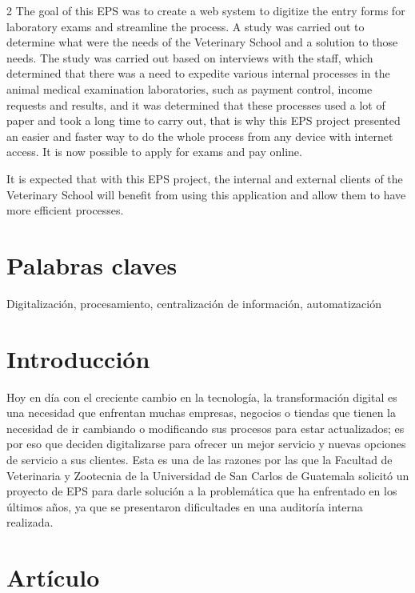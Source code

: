 \documentclass[12pt,spanish,Letterpaper,openany]{book}
\begin{document}
\begin {multicols}{2}
The goal of this EPS was to create a web system to digitize the entry forms for laboratory exams and streamline the process. A study was carried out to determine what were the needs of the Veterinary School and a solution to those needs.
The study was carried out based on interviews with the staff, which determined that there was a need to expedite various internal processes in the animal medical examination laboratories, such as payment control, income requests and results, and it was determined that these processes used a lot of paper and took a long time to carry out, that is why this EPS project presented an easier and faster way to do the whole process from any device with internet access. It is now possible to apply for exams and pay online.

It is expected that with this EPS project, the internal and external clients of the Veterinary School will benefit from using this application and allow them to have more efficient processes.

\hypertarget{palabras-claves-1}{%
\section{Palabras claves}\label{palabras-claves-1}}

Digitalización, procesamiento, centralización de información, automatización

\hypertarget{introducciuxf3n-1}{%
\section{Introducción}\label{introducciuxf3n-1}}

Hoy en día con el creciente cambio en la tecnología, la transformación digital es una necesidad que enfrentan muchas empresas, negocios o tiendas que tienen la necesidad de ir cambiando o modificando sus procesos para estar actualizados; es por eso que deciden digitalizarse para ofrecer un mejor servicio y nuevas opciones de servicio a sus clientes. Esta es una de las razones por las que la Facultad de Veterinaria y Zootecnia de la Universidad de San Carlos de Guatemala solicitó un proyecto de EPS para darle solución a la problemática que ha enfrentado en los últimos años, ya que se presentaron dificultades en una auditoría interna realizada.

\hypertarget{artuxedculo-1}{%
\section{Artículo}\label{artuxedculo-1}}


\end{multicols}
\end{document}
